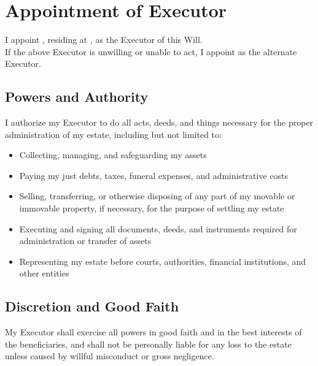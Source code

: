 
\section{Appointment of Executor}
\label{sec:executor}

I appoint \ExecutorName{}, residing at \ExecutorAddress{}, as the Executor of this Will.
\\

\noindent If the above Executor is unwilling or unable to act, I appoint \AlternateExecutor{} as the alternate Executor.

\subsection*{Powers and Authority}
I authorize my Executor to do all acts, deeds, and things necessary for the proper administration of my estate, including but not limited to:

\begin{itemize}
  \item Collecting, managing, and safeguarding my assets
  \item Paying my just debts, taxes, funeral expenses, and administrative costs
  \item Selling, transferring, or otherwise disposing of any part of my movable or immovable property, if necessary, for the purpose of settling my estate
  \item Executing and signing all documents, deeds, and instruments required for administration or transfer of assets
  \item Representing my estate before courts, authorities, financial institutions, and other entities
\end{itemize}

\subsection*{Discretion and Good Faith}
My Executor shall exercise all powers in good faith and in the best interests of the beneficiaries, and shall not be personally liable for any loss to the estate unless caused by willful misconduct or gross negligence.

